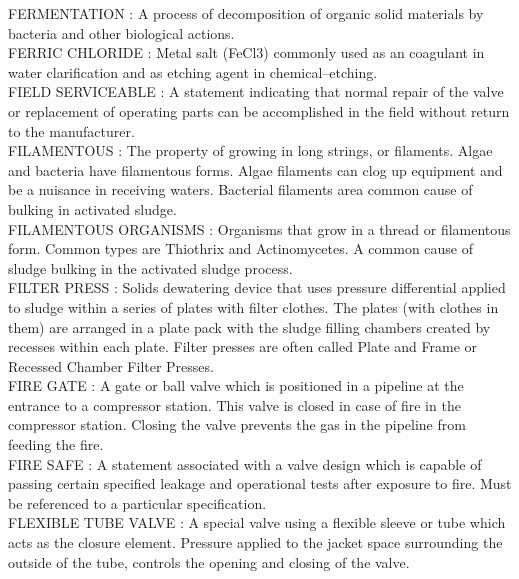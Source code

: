 \vspace{0.15cm}
FERMENTATION :  A process of decomposition of organic solid materials by bacteria and other biological actions.\\
\vspace{0.15cm}
FERRIC CHLORIDE :  Metal salt (FeCl3) commonly used as an coagulant in water clarification and as etching agent in chemical–etching.\\
\vspace{0.15cm}
FIELD SERVICEABLE :   A statement indicating that normal repair of the valve or replacement of operating parts can be accomplished in the field without return to the manufacturer.\\
\vspace{0.15cm}
FILAMENTOUS :  The property of growing in long strings, or filaments. Algae and bacteria have filamentous forms. Algae filaments can clog up equipment and be a nuisance in receiving waters. Bacterial filaments area common cause of bulking in activated sludge.\\
\vspace{0.15cm}
FILAMENTOUS ORGANISMS :  Organisms that grow in a thread or filamentous form. Common types are Thiothrix and Actinomycetes. A common cause of sludge bulking in the activated sludge process.\\
\vspace{0.15cm}
FILTER PRESS :  Solids dewatering device that uses pressure differential applied to sludge within a series of plates with filter clothes. The plates (with clothes in them) are arranged in a plate pack with the sludge filling chambers created by recesses within each plate. Filter presses are often called Plate and Frame or Recessed Chamber Filter Presses.\\
\vspace{0.15cm}
FIRE GATE :   A gate or ball valve which is positioned in a pipeline at the entrance to a compressor station. This valve is closed in case of fire in the compressor station. Closing the valve prevents the gas in the pipeline from feeding the fire.\\
\vspace{0.15cm}
FIRE SAFE :   A statement associated with a valve design which is capable of passing certain specified leakage and operational tests after exposure to fire. Must be referenced to a particular specification.\\
\vspace{0.15cm}
FLEXIBLE TUBE VALVE :   A special valve using a flexible sleeve or tube which acts as the closure element. Pressure applied to the jacket space surrounding the outside of the tube, controls the opening and closing of the valve.\\
